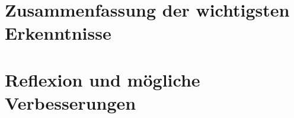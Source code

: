 \section{Zusammenfassung der wichtigsten Erkenntnisse}
\section{Reflexion und mögliche Verbesserungen}
\clearpage